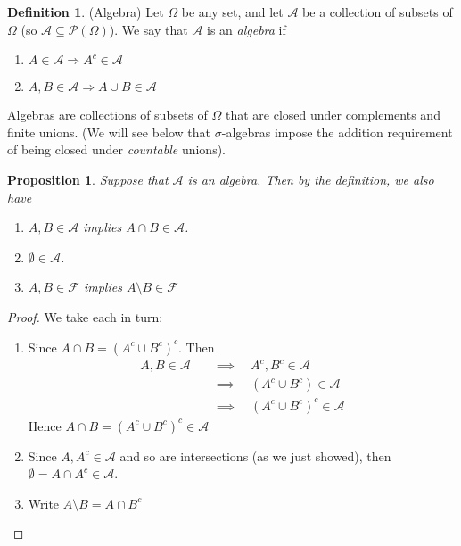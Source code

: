 \documentclass[12pt]{article}
\theoremstyle{plain}
\newtheorem{prop}[thm]{Proposition}
\theoremstyle{definition}
\newtheorem{defn}[thm]{Definition}
\theoremstyle{remark}
\newcommand{\sF}{\mathscr{F}}
\newcommand{\sA}{\mathscr{A}}
\begin{document}
\begin{defn}
\label{algebra}
(Algebra)
Let $\Omega$ be any set, and let $\mathscr{A}$ be a collection of subsets of
$\Omega$ (so $\mathscr{A}\subseteq\mathscr{P}(\Omega)$). We say that
$\mathscr{A}$ is an \emph{algebra} if
\begin{enumerate}
    \item $A\in\mathscr{A}\Rightarrow A^c\in\mathscr{A}$
    \item $A,B\in\mathscr{A} \Rightarrow A\cup B\in\mathscr{A}$
\end{enumerate}
Algebras are collections of subsets of $\Omega$ that are closed
under complements and finite unions. (We will see below that
$\sigma$-algebras impose the addition requirement of being closed under
\emph{countable} unions).
\end{defn}

\begin{prop}
\label{prop:algebra}
Suppose that $\sA$ is an algebra. Then by the definition, we also have
\begin{enumerate}
  \item $A,B\in\mathscr{A}$ implies $A\cap B\in \mathscr{A}$.
  \item $\emptyset \in \mathscr{A}$.
  \item $A,B\in \sF$ implies $A\setminus B \in \sF$
\end{enumerate}
\end{prop}
\begin{proof}
We take each in turn:
\begin{enumerate}
  \item Since $A\cap B = (A^c \cup B^c)^c$. Then
    \begin{align*}
      A,B\in\sA
      &\quad\implies\quad
      A^c,B^c\in\sA \\
      &\quad\implies\quad
      (A^c\cup B^c)\in\sA \\
      &\quad\implies\quad
      (A^c\cup B^c)^c\in\sA
    \end{align*}
    Hence $A\cap B = (A^c \cup B^c)^c \in \sA$

  \item Since $A, A^c \in \mathscr{A}$ and so are intersections (as we
    just showed), then $\emptyset = A\cap A^c \in \mathscr{A}$.

  \item Write $A\setminus B = A \cap B^c$
\end{enumerate}
\end{proof}
\end{document}
